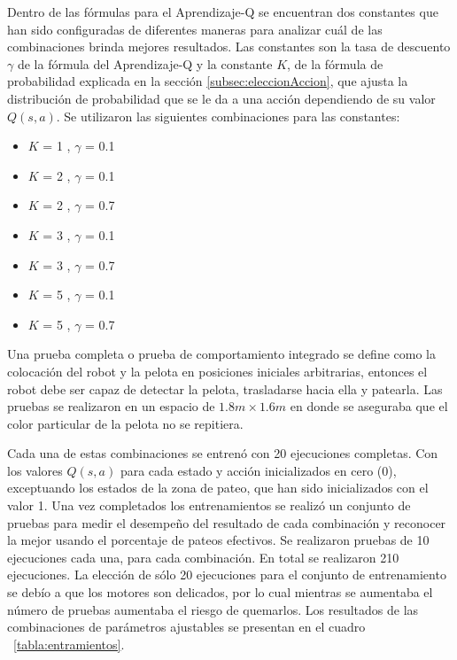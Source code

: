 Dentro de las fórmulas para el Aprendizaje-Q se encuentran dos constantes que han sido configuradas de diferentes maneras para analizar cuál de las combinaciones brinda mejores resultados. Las constantes son la tasa de descuento $\gamma$ de la fórmula del Aprendizaje-Q y la constante $K$, de la fórmula de probabilidad explicada en la secci\'on \ref{subsec:eleccionAccion}, que ajusta la distribución de probabilidad que se le da a una acción dependiendo de su valor $Q(s,a)$. Se utilizaron las siguientes combinaciones para las constantes:

\begin{itemize}[noitemsep,nolistsep]
 \setlength\itemsep{0.3pt}
\item $K$ = 1 , $\gamma$ = 0.1
\item $K$ = 2 , $\gamma$ = 0.1 
\item $K$ = 2 , $\gamma$ = 0.7
\item $K$ = 3 , $\gamma$ = 0.1
\item $K$ = 3 , $\gamma$ = 0.7
\item $K$ = 5 , $\gamma$ = 0.1
\item $K$ = 5 , $\gamma$ = 0.7
   
\end{itemize}

Una prueba completa o prueba de comportamiento integrado se define como la colocaci\'on del robot y la pelota en posiciones iniciales arbitrarias, entonces el robot debe ser capaz de detectar la pelota, trasladarse hacia ella y patearla. Las pruebas se realizaron en un espacio de $1.8 m \times 1.6 m$
en donde se aseguraba que el color particular de la pelota no se repitiera.

Cada una de estas combinaciones se entrenó con 20 ejecuciones completas. Con los valores $Q(s,a)$ para cada estado y acción inicializados en cero (0), exceptuando los estados de la zona de pateo, que han sido inicializados con el valor 1. Una vez completados los entrenamientos se realizó un conjunto de pruebas para medir el desempeño del resultado de cada combinación y reconocer la mejor usando el porcentaje de pateos efectivos. Se realizaron pruebas de 10 ejecuciones cada una, para cada combinación. En total se realizaron 210 ejecuciones. La elecci\'on de s\'olo 20 ejecuciones para el conjunto de entrenamiento se deb\'io a que los motores son delicados, por lo cual mientras se aumentaba el n\'umero de pruebas aumentaba el riesgo de quemarlos. Los resultados de las combinaciones de par\'ametros ajustables se presentan en el cuadro ~\ref{tabla:entramientos}.

